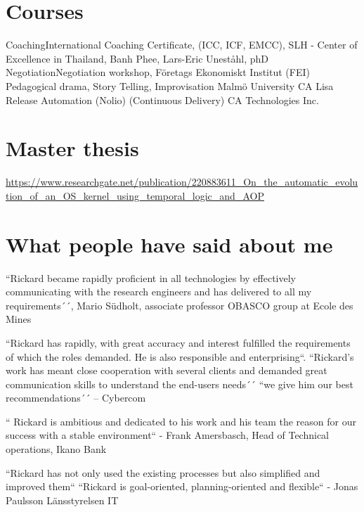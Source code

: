 \documentclass[11pt,a4paper,sans]{moderncv}
\begin{document}
\section{Courses}
{Coaching}{International Coaching Certificate, (ICC, ICF, EMCC), SLH - Center of Excellence in Thailand, Banh Phee,  Lars-Eric Uneståhl, phD }
 {Negotiation}{Negotiation workshop, Företags Ekonomiskt Institut (FEI)}
{Pedagogical drama, Story Telling, Improvisation }{Malmö University }
 {CA Lisa Release Automation (Nolio) (Continuous Delivery) CA Technologies Inc.}

\section{Master thesis}
\url{https://www.researchgate.net/publication/220883611\_On_the_automatic_evolution_of_an_OS_kernel_using_temporal_logic_and_AOP}

\section{What people have said about me}
\large 

\begin{quotelist}
    \item
    ``Rickard became rapidly proficient in all technologies by effectively communicating with the research engineers and has delivered to all my requirements´´,
      Mario Südholt, associate professor OBASCO group at Ecole des Mines 
\item
        ``Rickard has rapidly, with great accuracy and interest fulfilled the requirements of which the roles demanded.  He is also responsible and enterprising``. ``Rickard’s work has meant close cooperation with several clients and demanded great communication skills to understand the end-users needs´´ 
        ``we give him our best recommendations´´ – Cybercom 
\item     
        `` Rickard is ambitious and dedicated to his work and his team the reason for our success with a stable environment``  - Frank Amersbasch, Head of Technical operations, Ikano Bank 
\item  ``Rickard has not only used the existing processes but also simplified and improved them`` ``Rickard is goal-oriented, planning-oriented and flexible``  - Jonas Paulsson Länsstyrelsen IT 
       
  \end{quotelist}
\end{document}
